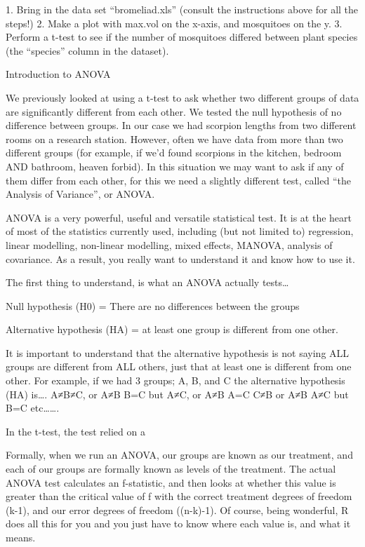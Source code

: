 \documentclass{article}
\begin{document}
    1. Bring in the data set “bromeliad.xls” (consult the instructions above for all the steps!)
    2. Make a plot with max.vol on the x-axis, and mosquitoes on the y.
    3. Perform a t-test to see if the number of mosquitoes differed between plant species (the “species” column in the dataset). 

Introduction to ANOVA

We previously looked at using a t-test to ask whether two different groups of data are significantly different from each other. We tested the null hypothesis of no difference between groups. In our case we had scorpion lengths from two different rooms on a research station. However, often we have data from more than two different groups (for example, if we’d found scorpions in the kitchen, bedroom AND bathroom, heaven forbid). In this situation we may want to ask if any of them differ from each other, for this we need a slightly different test, called “the Analysis of Variance”, or ANOVA. 

ANOVA is a very powerful, useful and versatile statistical test. It is at the heart of most of the statistics currently used, including (but not limited to) regression, linear modelling, non-linear modelling, mixed effects, MANOVA, analysis of covariance. As a result, you really want to understand it and know how to use it. 

The first thing to understand, is what an ANOVA actually tests…

Null hypothesis (H0) = There are no differences between the groups

Alternative hypothesis (HA) = at least one group is different from one other. 

It is important to understand that the alternative hypothesis is not saying ALL groups are different from ALL others, just that at least one is different from one other. For example, if we had 3 groups; A, B, and C the alternative hypothesis (HA) is…. A≠B≠C, 
    or A≠B B=C but A≠C, 
    or A≠B A=C C≠B
    or A≠B A≠C but B=C
    etc…….

In the t-test, the test relied on a 

Formally, when we run an ANOVA, our groups are known as our treatment, and each of our groups are formally known as levels of the treatment. The actual ANOVA test calculates an f-statistic, and then looks at whether this value is greater than the critical value of f with the correct treatment degrees of freedom (k-1), and our error degrees of freedom ((n-k)-1). Of course, being wonderful, R does all this for you and you just have to know where each value is, and what it means.
\end{document}
